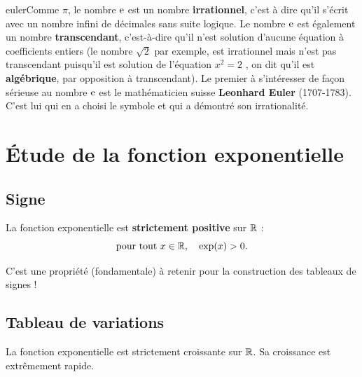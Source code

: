 \documentclass[a4paper,11pt]{article}
\begin{document}
\begin{chistoire}
\vspace{-0.22cm}
\lettrine[findent=.5em,nindent=0pt,lines=3,image,novskip=0pt]{euler}{}Comme $\pi$, le nombre ${\rm e}$ est un nombre \textbf{irrationnel}, c'est à dire qu'il s'écrit avec un nombre infini de décimales sans suite logique. Le nombre ${\rm e}$ est également un nombre \textbf{transcendant}, c'est-à-dire qu'il n’est solution d'aucune équation à coefficients entiers (le nombre  $\sqrt{2}$  par exemple, est irrationnel mais n'est pas transcendant puisqu'il est solution de l'équation $x^2=2$ , on dit qu'il est  \textbf{algébrique}, par opposition à transcendant). Le premier à s'intéresser de façon sérieuse au nombre ${\rm e}$ est le mathématicien suisse \textbf{Leonhard Euler} (1707-1783). C'est lui qui en a choisi le symbole et qui a démontré son irrationalité.
\end{chistoire}

\section{Étude de la fonction exponentielle}

\subsection{Signe}

\begin{cprop}
La fonction exponentielle est \textbf{strictement positive} sur $\R$ : \[\text{pour tout }x \in \R,\quad \exp(x)>0.\]
\end{cprop}

\begin{crmq}
C'est une propriété (fondamentale) à retenir pour la construction des tableaux de signes !
\end{crmq}

\subsection{Tableau de variations}

\begin{cprop}
La fonction exponentielle est strictement croissante sur $\R$. Sa croissance est extrêmement rapide.

\begin{center}
\end{center}
\end{cprop}
\end{document}
